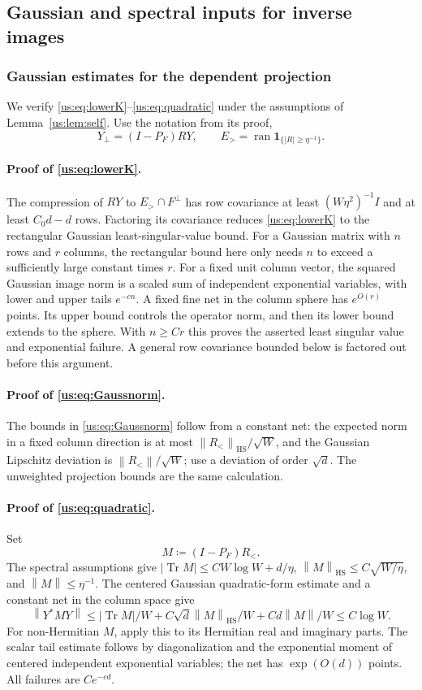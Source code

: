 \documentclass[11pt]{article}
\numberwithin{equation}{section}
\theoremstyle{remark}
\newcommand{\Tr}{\operatorname{Tr}}
\newcommand{\ran}{\operatorname{ran}}
\newcommand{\HS}{\mathrm{HS}}
\newcommand{\one}{\mathbf 1}
\newcommand{\norm}[1]{\left\|#1\right\|}
\begin{document}
\subsection{Gaussian and spectral inputs for inverse images}
\label{app:inverse-image-inputs}

\subsubsection{Gaussian estimates for the dependent projection}
\label{app:gaussian-projection-inputs}

We verify \eqref{us:eq:lowerK}--\eqref{us:eq:quadratic} under the
assumptions of Lemma~\ref{us:lem:self}. Use the notation from its proof,
\[
 Y_\perp=(I-P_F)RY,\qquad
 E_>=\ran\one_{\{|R|\ge\eta^{-1}\}}.
\]

\paragraph{Proof of \eqref{us:eq:lowerK}.}
The compression of $RY$ to $E_>\cap F^\perp$ has row covariance at least
$(W\eta^2)^{-1}I$ and at least $C_0d-d$ rows. Factoring its covariance
reduces \eqref{us:eq:lowerK} to the rectangular Gaussian
least-singular-value bound.
For a Gaussian matrix with $n$ rows and $r$ columns, the rectangular
bound here only needs $n$ to exceed a sufficiently large constant times $r$.
For a fixed unit column vector, the squared Gaussian image norm is a
scaled sum of independent exponential variables, with lower and upper
tails $e^{-cn}$. A fixed fine net in the column sphere has $e^{O(r)}$
points. Its upper bound controls the operator norm, and then its lower
bound extends to the sphere. With $n\ge C r$ this proves the asserted
least singular value and exponential failure. A general row covariance
bounded below is factored out before this argument.

\paragraph{Proof of \eqref{us:eq:Gaussnorm}.}
The bounds in \eqref{us:eq:Gaussnorm} follow from a constant net: the expected norm in a fixed
column direction is at most $\norm{R_<}_{\HS}/\sqrt W$, and the Gaussian
Lipschitz deviation is $\norm{R_<}/\sqrt W$; use a deviation of order
$\sqrt d$. The unweighted projection bounds are the same calculation.


\paragraph{Proof of \eqref{us:eq:quadratic}.}
Set
\[
 M\coloneqq(I-P_F)R_<.
\]
The spectral assumptions give
$|\Tr M|\le CW\log W+d/\eta$, $\norm M_{\HS}\le C\sqrt{W/\eta}$,
and $\norm M\le\eta^{-1}$. The centered Gaussian quadratic-form
estimate and a constant net in the column space give
\[
 \norm{Y^*MY}\le |\Tr M|/W+
 C\sqrt d\norm M_{\HS}/W+Cd\norm M/W\le C\log W.
\]
For non-Hermitian $M$, apply this to its Hermitian real and imaginary
parts. The scalar tail estimate follows by diagonalization and the
exponential moment of centered independent exponential variables; the
net has $\exp(O(d))$ points. All failures are $Ce^{-cd}$.
\end{document}
